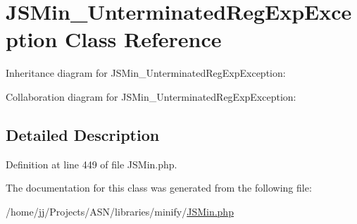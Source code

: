 \hypertarget{class_j_s_min___unterminated_reg_exp_exception}{}\section{J\+S\+Min\+\_\+\+Unterminated\+Reg\+Exp\+Exception Class Reference}
\label{class_j_s_min___unterminated_reg_exp_exception}


Inheritance diagram for J\+S\+Min\+\_\+\+Unterminated\+Reg\+Exp\+Exception\+:


Collaboration diagram for J\+S\+Min\+\_\+\+Unterminated\+Reg\+Exp\+Exception\+:


\subsection{Detailed Description}


Definition at line 449 of file J\+S\+Min.\+php.



The documentation for this class was generated from the following file\+:\begin{DoxyCompactItemize}
\item 
/home/jj/\+Projects/\+A\+S\+N/libraries/minify/\hyperlink{_j_s_min_8php}{J\+S\+Min.\+php}\end{DoxyCompactItemize}
